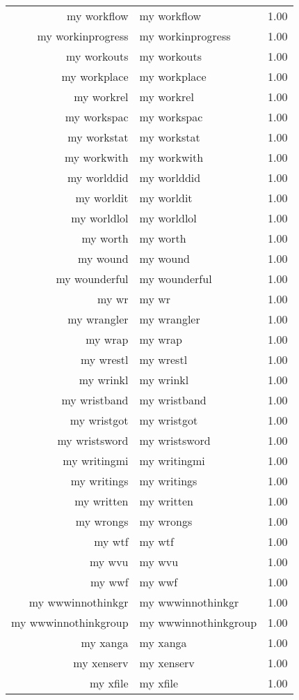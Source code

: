 \begin{table}[ht]
\begin{tabular}{rlr}
  my workflow & my workflow & 1.00 \\ 
  my workinprogress & my workinprogress & 1.00 \\ 
  my workouts & my workouts & 1.00 \\ 
  my workplace & my workplace & 1.00 \\ 
  my workrel & my workrel & 1.00 \\ 
  my workspac & my workspac & 1.00 \\ 
  my workstat & my workstat & 1.00 \\ 
  my workwith & my workwith & 1.00 \\ 
  my worlddid & my worlddid & 1.00 \\ 
  my worldit & my worldit & 1.00 \\ 
  my worldlol & my worldlol & 1.00 \\ 
  my worth & my worth & 1.00 \\ 
  my wound & my wound & 1.00 \\ 
  my wounderful & my wounderful & 1.00 \\ 
  my wr & my wr & 1.00 \\ 
  my wrangler & my wrangler & 1.00 \\ 
  my wrap & my wrap & 1.00 \\ 
  my wrestl & my wrestl & 1.00 \\ 
  my wrinkl & my wrinkl & 1.00 \\ 
  my wristband & my wristband & 1.00 \\ 
  my wristgot & my wristgot & 1.00 \\ 
  my wristsword & my wristsword & 1.00 \\ 
  my writingmi & my writingmi & 1.00 \\ 
  my writings & my writings & 1.00 \\ 
  my written & my written & 1.00 \\ 
  my wrongs & my wrongs & 1.00 \\ 
  my wtf & my wtf & 1.00 \\ 
  my wvu & my wvu & 1.00 \\ 
  my wwf & my wwf & 1.00 \\ 
  my wwwinnothinkgr & my wwwinnothinkgr & 1.00 \\ 
  my wwwinnothinkgroup & my wwwinnothinkgroup & 1.00 \\ 
  my xanga & my xanga & 1.00 \\ 
  my xenserv & my xenserv & 1.00 \\ 
  my xfile & my xfile & 1.00 \\ 

\end{tabular}
\end{table}
